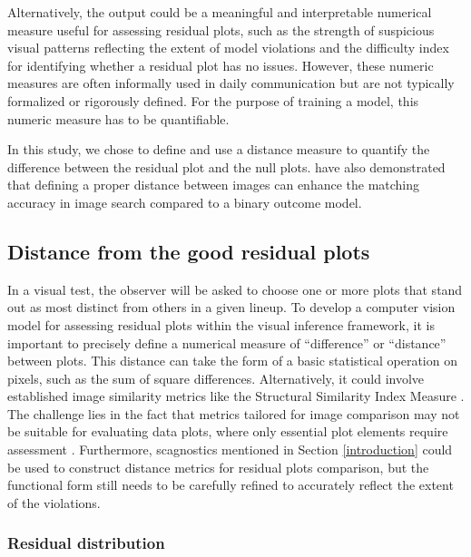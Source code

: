 \documentclass[]{interact}
\theoremstyle{plain}%
\theoremstyle{definition}
\theoremstyle{remark}
\begin{document}
Alternatively, the output could be a meaningful and interpretable
numerical measure useful for assessing residual plots, such as the
strength of suspicious visual patterns reflecting the extent of model
violations and the difficulty index for identifying whether a residual
plot has no issues. However, these numeric measures are often informally
used in daily communication but are not typically formalized or
rigorously defined. For the purpose of training a model, this numeric
measure has to be quantifiable.

In this study, we chose to define and use a distance measure to quantify
the difference between the residual plot and the null plots.
\citet{vo2016localizing} have also demonstrated that defining a proper
distance between images can enhance the matching accuracy in image
search compared to a binary outcome model.

\hypertarget{distance-from-the-good-residual-plots}{%
\subsection{Distance from the good residual
plots}\label{distance-from-the-good-residual-plots}}

In a visual test, the observer will be asked to choose one or more plots
that stand out as most distinct from others in a given lineup. To
develop a computer vision model for assessing residual plots within the
visual inference framework, it is important to precisely define a
numerical measure of ``difference'' or ``distance'' between plots. This
distance can take the form of a basic statistical operation on pixels,
such as the sum of square differences. Alternatively, it could involve
established image similarity metrics like the Structural Similarity
Index Measure \citep{wang2004image}. The challenge lies in the fact that
metrics tailored for image comparison may not be suitable for evaluating
data plots, where only essential plot elements require assessment
\citep{chowdhury2018measuring}. Furthermore, scagnostics mentioned in
Section \ref{introduction} could be used to construct distance metrics
for residual plots comparison, but the functional form still needs to be
carefully refined to accurately reflect the extent of the violations.

\hypertarget{residual-distribution}{%
\subsubsection{Residual distribution}\label{residual-distribution}}
\end{document}
